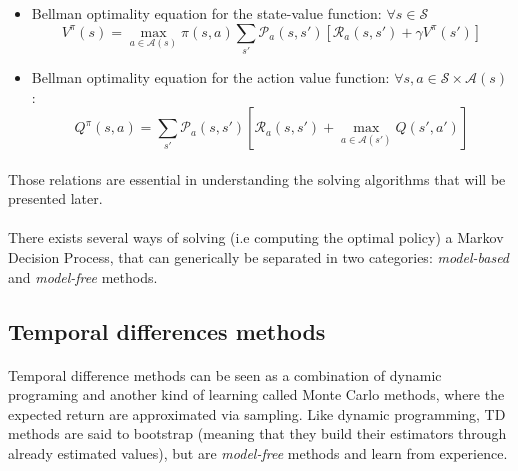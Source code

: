 {{{{				\vspace{10pt}
				
				{
					\begin{itemize}[label=$\triangleright$]
						\item Bellman optimality equation for the state-value function: $\forall s \in\mathcal{S}$ 
						\begin{equation}
							V^\pi(s) = \max_{a\in\mathcal{A}(s)}\pi(s,a)\sum_{s'} \mathcal{P}_a(s,s')\left[\mathcal{R}_a(s,s') + \gamma V^\pi(s')\right]
						\end{equation}
						\item Bellman optimality equation for the action value function: $\forall{s,a}\in\mathcal{S}\times\mathcal{A}(s)$: 
						\begin{equation}
							Q^\pi(s,a) = \sum_{s'}\mathcal{P}_a(s,s')\left[ \mathcal{R}_a(s,s') + \max_{a\in\mathcal{A}(s')} Q(s',a') \right]
						\end{equation}
					\end{itemize}
				}
				\paragraph{} Those relations are essential in understanding the solving algorithms that will be presented later. 
			}
			}
			
			\paragraph{} There exists several ways of solving (i.e computing the optimal policy) a Markov Decision Process, that can generically be separated in two categories: \emph{model-based} and \emph{model-free} methods. 
			
		
		\subsection{Temporal differences methods}
		{
			\paragraph{} Temporal difference methods can be seen as a combination of dynamic programing and another kind of learning called Monte Carlo methods, where the expected return are approximated via sampling. Like dynamic programming, TD methods are said to bootstrap (meaning that they build their estimators through already estimated values), but are \emph{model-free} methods and learn from experience. 
			
}}}
